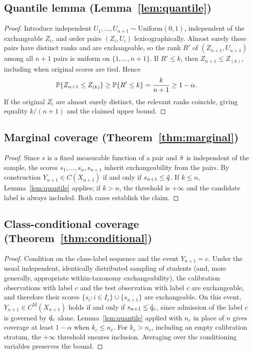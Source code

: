 \subsection{Quantile lemma (Lemma~\ref{lem:quantile})}
\begin{proof}
Introduce independent $U_1,\ldots,U_{n+1}\sim\mathrm{Uniform}(0,1)$,
independent of the exchangeable $Z_i$, and order pairs $(Z_i,U_i)$
lexicographically. Almost surely these pairs have distinct ranks and are
exchangeable, so the rank $R'$ of $(Z_{n+1},U_{n+1})$ among all $n+1$ pairs
is uniform on $\{1,\ldots,n+1\}$. If $R'\le k$, then
$Z_{n+1}\le Z_{(k)}$, including when original scores are tied. Hence
\[
\mathbb{P}\{Z_{n+1}\le Z_{(k)}\}\ge\mathbb{P}\{R'\le k\}
=\frac{k}{n+1}\ge1-\alpha.
\]
If the original $Z_i$ are almost surely distinct, the relevant ranks
coincide, giving equality $k/(n+1)$ and the claimed upper bound.


\end{proof}

\subsection{Marginal coverage (Theorem~\ref{thm:marginal})}
\begin{proof}
Since $s$ is a fixed measurable function of a pair and $\hat{\pi}$ is independent of
the sample, the scores $s_1, \dots, s_n, s_{n+1}$ inherit exchangeability from
the pairs. By construction $Y_{n+1} \in C(X_{n+1})$ if and only if
$s_{n+1} \le \hat{q}$. If $k\le n$, Lemma~\ref{lem:quantile} applies;
if $k>n$, the threshold is $+\infty$ and the candidate label is always
included. Both cases establish the claim.
\end{proof}

\subsection{Class-conditional coverage (Theorem~\ref{thm:conditional})}
\begin{proof}
Condition on the class-label sequence and the event $Y_{n+1}=c$.
Under the usual independent, identically distributed sampling of students
(and, more generally, appropriate within-taxonomy exchangeability), the
calibration observations with label $c$ and the test observation with
label $c$ are exchangeable, and therefore their scores
$\{s_i : i \in I_c\} \cup \{s_{n+1}\}$ are exchangeable. On this event,
$Y_{n+1} \in C^{\mathrm{M}}(X_{n+1})$ holds if and only if
$s_{n+1} \le \hat{q}_c$, since admission of the label $c$ is governed by
$\hat{q}_c$ alone. Lemma~\ref{lem:quantile} applied with $n_c$ in place of $n$
gives coverage at least $1-\alpha$ when $k_c\le n_c$. For $k_c>n_c$,
including an empty calibration stratum, the $+\infty$ threshold ensures
inclusion. Averaging over the conditioning variables preserves the bound.
\end{proof}

